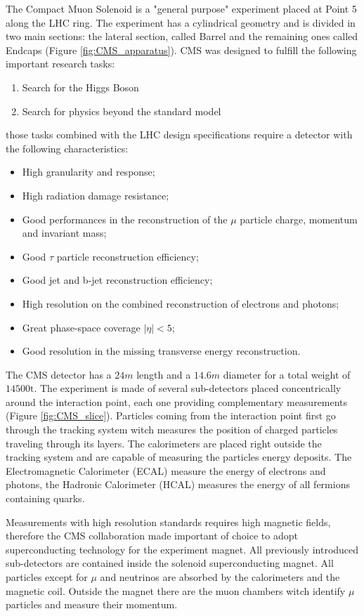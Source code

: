The Compact Muon Solenoid is a "general purpose" experiment placed at Point 5 along the LHC ring. The experiment has a cylindrical geometry and is divided in two main sections: the lateral section, called Barrel and the remaining ones called Endcaps (Figure \ref{fig:CMS_apparatus}).   
CMS was designed to fulfill the following important research tasks:
\begin{enumerate}
	\item Search for the Higgs Boson
	\item Search for physics beyond the standard model
\end{enumerate}
those tasks combined with the LHC design specifications require a detector with the following characteristics:
\begin{itemize}
	\item High granularity and response;
	\item High radiation damage resistance;
	\item Good performances in the reconstruction of the $\mu$ particle charge, momentum and invariant mass;
	\item Good $\tau$ particle reconstruction efficiency;
	\item Good jet and b-jet reconstruction efficiency;
	\item High resolution on the combined reconstruction of electrons and photons;
	\item Great phase-space coverage $|\eta| < 5$;
	\item Good resolution in the missing transverse energy reconstruction.
\end{itemize} 

The CMS detector has a $24 m$ length and a $14.6 m$ diameter for a total weight of $14500 \text{t}$. The experiment is made of several sub-detectors placed concentrically around the interaction point, each one providing complementary measurements (Figure \ref{fig:CMS_slice}). Particles coming from the interaction point first go through the tracking system witch measures the position of charged particles traveling through its layers. The calorimeters are placed right outside the tracking system and are capable of measuring the particles energy deposits. The Electromagnetic Calorimeter (ECAL) measure the energy of electrons and photons, the Hadronic Calorimeter (HCAL) measures the energy of all fermions containing quarks.
 
Measurements with high resolution standards requires high magnetic fields, therefore the CMS collaboration made important of choice to adopt superconducting technology for the experiment magnet. All previously introduced sub-detectors are contained inside the solenoid superconducting magnet. All particles except for $\mu$ and neutrinos are absorbed by the calorimeters and the magnetic coil. Outside the magnet there are the muon chambers witch identify $\mu$ particles and measure their momentum.

